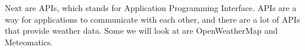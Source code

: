 \documentclass[../paper.tex]{subfiles}
\begin{document}
    Next are APIs, which stands for Application Programming Interface.
    APIs are a way for applications to communicate with each other, and there are a lot of APIs that provide weather data.
    Some we will look at are OpenWeatherMap and Meteomatics.
\end{document}
